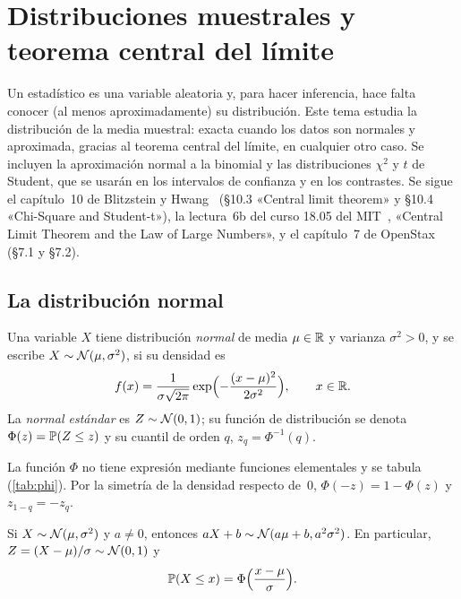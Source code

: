 \chapter{Distribuciones muestrales y teorema central del límite}
\label{tema:3}

Un estadístico es una variable aleatoria y, para hacer inferencia, hace falta conocer (al menos aproximadamente) su distribución. Este tema estudia la distribución de la media muestral: exacta cuando los datos son normales y aproximada, gracias al teorema central del límite, en cualquier otro caso. Se incluyen la aproximación normal a la binomial y las distribuciones $\chi^{2}$ y $t$ de Student, que se usarán en los intervalos de confianza y en los contrastes. Se sigue el capítulo~10 de Blitzstein y Hwang~\cite{bh} (§10.3 «Central limit theorem» y §10.4 «Chi-Square and Student-t»), la lectura~6b del curso 18.05 del MIT~\cite{mit1805}, «Central Limit Theorem and the Law of Large Numbers», y el capítulo~7 de OpenStax~\cite{openstax} (§7.1 y §7.2).

\section{La distribución normal}

\begin{definicion}\label{def:t3-normal}
Una variable $X$ tiene distribución \emph{normal} de media $\mu\in\mathbb{R}$ y varianza $\sigma^{2}>0$, y se escribe $X\sim\mathcal{N}(\mu,\sigma^{2})$, si su densidad es
\[
f(x)=\frac{1}{\sigma\sqrt{2\pi}}\exp\Bigl(-\frac{(x-\mu)^{2}}{2\sigma^{2}}\Bigr),\qquad x\in\mathbb{R}.
\]
La \emph{normal estándar} es $Z\sim\mathcal{N}(0,1)$; su función de distribución se denota $\Phi(z)=\mathbb{P}(Z\le z)$ y su cuantil de orden $q$, $z_q=\Phi^{-1}(q)$.
\end{definicion}

La función $\Phi$ no tiene expresión mediante funciones elementales y se tabula (\cref{tab:phi}). Por la simetría de la densidad respecto de~$0$, $\Phi(-z)=1-\Phi(z)$ y $z_{1-q}=-z_q$.

\begin{proposicion}[Tipificación]\label{prop:t3-tipificacion}
Si $X\sim\mathcal{N}(\mu,\sigma^{2})$ y $a\neq0$, entonces $aX+b\sim\mathcal{N}(a\mu+b,a^{2}\sigma^{2})$. En particular, $Z=(X-\mu)/\sigma\sim\mathcal{N}(0,1)$ y
\[
\mathbb{P}(X\le x)=\Phi\Bigl(\frac{x-\mu}{\sigma}\Bigr).
\]
\end{proposicion}

